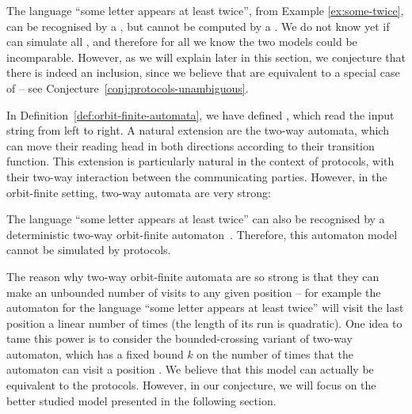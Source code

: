 \begin{myexample}
     \label{ex:protocol-not-nofa}  
    The language ``some letter appears at least twice'', from Example
    \ref{ex:some-twice}, can be recognised by a , but cannot be computed by a .
    We do not know yet if
     can simulate all , 
    and therefore for
    all we know the two models could be incomparable. However, as we will
    explain later in this section, we conjecture that there is indeed an
    inclusion, since we believe that 
    are equivalent to a special case
    of  -- see
    Conjecture~\ref{conj:protocols-unambiguous}.
\end{myexample}

In Definition~\ref{def:orbit-finite-automata}, we have defined , which read the input string from left to right. A
natural extension are the two-way automata, which can move their reading head
in both directions according to their transition function. This extension is
particularly natural in the context of protocols, with their two-way
interaction between the communicating parties. However, in the orbit-finite
setting, two-way automata are very strong:

\begin{myexample}\label{ex:protocol-not-2dofa}
    The language ``some letter appears at least twice'' can also be recognised
    by a deterministic two-way orbit-finite automaton~\cite[Example
    18]{bojanczyk_slightly}. Therefore, this automaton model cannot be
    simulated by protocols.

    The reason why two-way orbit-finite automata are so strong is that they can
    make an unbounded number of visits to any given position -- for example the
    automaton for the language ``some letter appears at least twice'' will
    visit the last position a linear number of times (the length of its run is
    quadratic). One idea to tame this power is to consider the bounded-crossing
    variant of two-way automaton, which has a fixed bound $k$ on the number of
    times that the automaton can visit a position \cite[p.~92]{neven2003power}.
    We believe that this model can actually be equivalent to the protocols.
    However, in our conjecture, we will focus on the better studied model
    presented in the following section.
\end{myexample}

